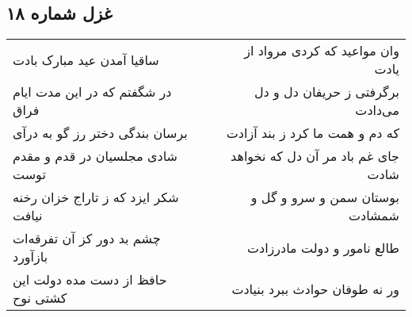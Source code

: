 \begin{center}
\section*{غزل شماره ۱۸}
\label{sec:sh018}
\begin{longtable}{l p{0.5cm} r}
ساقیا آمدن عید مبارک بادت
&&
وان مواعید که کردی مرواد از یادت
\\
در شگفتم که در این مدت ایام فراق
&&
برگرفتی ز حریفان دل و دل می‌دادت
\\
برسان بندگی دختر رز گو به درآی
&&
که دم و همت ما کرد ز بند آزادت
\\
شادی مجلسیان در قدم و مقدم توست
&&
جای غم باد مر آن دل که نخواهد شادت
\\
شکر ایزد که ز تاراج خزان رخنه نیافت
&&
بوستان سمن و سرو و گل و شمشادت
\\
چشم بد دور کز آن تفرقه‌ات بازآورد
&&
طالع نامور و دولت مادرزادت
\\
حافظ از دست مده دولت این کشتی نوح
&&
ور نه طوفان حوادث ببرد بنیادت
\\
\end{longtable}
\end{center}
